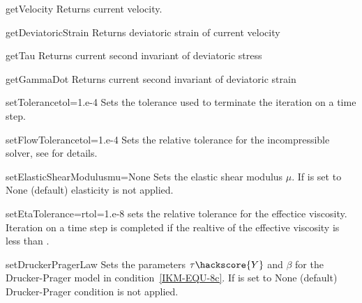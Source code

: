 \begin{methoddesc}[IncompressibleIsotropicFlowCartesian]{getVelocity}{}
Returns current velocity.
\end{methoddesc}

\begin{methoddesc}[IncompressibleIsotropicFlowCartesian]{getDeviatoricStrain}{}
Returns deviatoric strain of current velocity
\end{methoddesc}

\begin{methoddesc}[IncompressibleIsotropicFlowCartesian]{getTau}{}
Returns current second invariant of deviatoric stress
\end{methoddesc}

\begin{methoddesc}[IncompressibleIsotropicFlowCartesian]{getGammaDot}{}
Returns current second invariant of deviatoric strain
\end{methoddesc}


\begin{methoddesc}[IncompressibleIsotropicFlowCartesian]{setTolerance}{tol=1.e-4}
Sets the tolerance used to terminate the iteration on a time step.
\end{methoddesc}

\begin{methoddesc}[IncompressibleIsotropicFlowCartesian]{setFlowTolerance}{tol=1.e-4}
Sets the relative tolerance for the incompressible solver, see  for details.
\end{methoddesc}

\begin{methoddesc}[IncompressibleIsotropicFlowCartesian]{setElasticShearModulus}{mu=None}
Sets the elastic shear modulus $\mu$. If  is set to None (default) elasticity is not applied.
\end{methoddesc}

\begin{methoddesc}[IncompressibleIsotropicFlowCartesian]{setEtaTolerance=}{rtol=1.e-8}
sets the relative tolerance for the effectice viscosity. Iteration on a time step is completed if the realtive of the effective viscosity is less than .
\end{methoddesc}

\begin{methoddesc}[IncompressibleIsotropicFlowCartesian]{setDruckerPragerLaw}
{}
Sets the parameters $\tau\hackscore{Y}$ and $\beta$ for the Drucker-Prager model in condition~\ref{IKM-EQU-8c}. If  is set to None (default) Drucker-Prager
condition is not applied.
\end{methoddesc}

